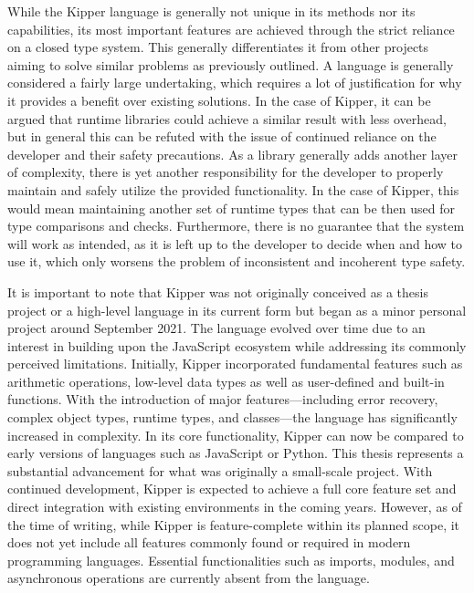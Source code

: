 While the Kipper language is generally not unique in its methods nor its capabilities, its most important features are achieved through the strict reliance on a closed type system. This generally differentiates it from other projects aiming to solve similar problems as previously outlined. A language is generally considered a fairly large undertaking, which requires a lot of justification for why it provides a benefit over existing solutions. In the case of Kipper, it can be argued that runtime libraries could achieve a similar result with less overhead, but in general this can be refuted with the issue of continued reliance on the developer and their safety precautions. As a library generally adds another layer of complexity, there is yet another responsibility for the developer to properly maintain and safely utilize the provided functionality. In the case of Kipper, this would mean maintaining another set of runtime types that can be then used for type comparisons and checks. Furthermore, there is no guarantee that the system will work as intended, as it is left up to the developer to decide when and how to use it, which only worsens the problem of inconsistent and incoherent type safety.

It is important to note that Kipper was not originally conceived as a thesis project or a high-level language in its current form but began as a minor personal project around September 2021. The language evolved over time due to an interest in building upon the JavaScript ecosystem while addressing its commonly perceived limitations. Initially, Kipper incorporated fundamental features such as arithmetic operations, low-level data types as well as user-defined and built-in functions. With the introduction of major features—including error recovery, complex object types, runtime types, and classes—the language has significantly increased in complexity. In its core functionality, Kipper can now be compared to early versions of languages such as JavaScript or Python. This thesis represents a substantial advancement for what was originally a small-scale project. With continued development, Kipper is expected to achieve a full core feature set and direct integration with existing environments in the coming years. However, as of the time of writing, while Kipper is feature-complete within its planned scope, it does not yet include all features commonly found or required in modern programming languages. Essential functionalities such as imports, modules, and asynchronous operations are currently absent from the language.

